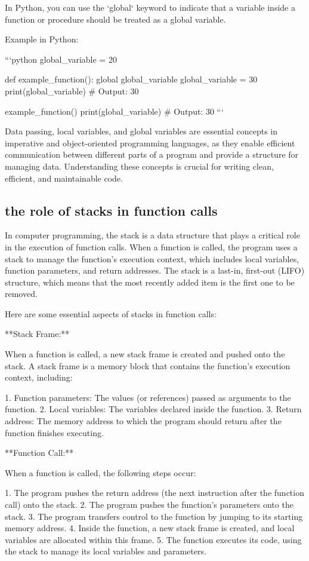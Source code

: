 \documentclass{article}
\begin{document}
In Python, you can use the `global` keyword to indicate that a variable inside a function or procedure should be treated as a global variable.

Example in Python:

```python
global_variable = 20

def example_function():
    global global_variable
    global_variable = 30
    print(global_variable)  # Output: 30

example_function()
print(global_variable)  # Output: 30
```

Data passing, local variables, and global variables are essential concepts in imperative and object-oriented programming languages, as they enable efficient communication between different parts of a program and provide a structure for managing data. Understanding these concepts is crucial for writing clean, efficient, and maintainable code.


\subsection{the role of stacks in function calls}

In computer programming, the stack is a data structure that plays a critical role in the execution of function calls. When a function is called, the program uses a stack to manage the function's execution context, which includes local variables, function parameters, and return addresses. The stack is a last-in, first-out (LIFO) structure, which means that the most recently added item is the first one to be removed.

Here are some essential aspects of stacks in function calls:

**Stack Frame:**

When a function is called, a new stack frame is created and pushed onto the stack. A stack frame is a memory block that contains the function's execution context, including:

1. Function parameters: The values (or references) passed as arguments to the function.
2. Local variables: The variables declared inside the function.
3. Return address: The memory address to which the program should return after the function finishes executing.

**Function Call:**

When a function is called, the following steps occur:

1. The program pushes the return address (the next instruction after the function call) onto the stack.
2. The program pushes the function's parameters onto the stack.
3. The program transfers control to the function by jumping to its starting memory address.
4. Inside the function, a new stack frame is created, and local variables are allocated within this frame.
5. The function executes its code, using the stack to manage its local variables and parameters.
\end{document}

